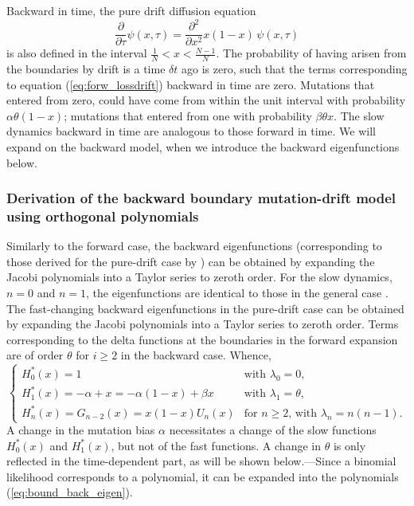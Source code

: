 \documentclass[preprint]{elsarticle}
\begin{document}
{Backward in time, the pure drift diffusion equation
\begin{equation}\label{eq:forw_drift}
  \frac{\partial}{\partial \tau} \psi(x,\tau) =\frac{\partial^2}{\partial x^2}x(1-x)\,\psi(x,\tau) 
\end{equation}
is also defined in the interval $\frac1N<x<\frac{N-1}N$. The probability of having arisen from the boundaries by drift is a time $\delta t$ ago is zero, such that the terms corresponding to equation (\ref{eq:forw_lossdrift}) backward in time are zero. Mutations that entered from zero, could have come from within the unit interval with probability $\alpha\theta(1-x)$; mutations that entered from one with probability $\beta\theta x$. The slow dynamics backward in time are analogous to those forward in time. We will expand on the backward model, when we introduce the backward eigenfunctions below.

\subsubsection{Derivation of the backward boundary mutation-drift model using orthogonal polynomials}

Similarly to the forward case, the backward eigenfunctions (corresponding to those derived for the pure-drift case by \citet{Song12}) can be obtained by expanding the Jacobi polynomials into a Taylor series to zeroth order. For the slow dynamics, $n=0$ and $n=1$, the eigenfunctions are identical to those in the general case \citep{Song12}. The fast-changing backward eigenfunctions in the pure-drift case \citep{Song12} can be obtained by expanding the Jacobi polynomials into a Taylor series to zeroth order. Terms corresponding to the delta functions at the boundaries in the forward expansion are of order $\theta$ for $i\geq 2$ in the backward case. Whence,
\begin{equation}\label{eq:bound_back_eigen}
    \begin{cases}
    H_0^{*}(x)= 1 &\text{with $\lambda_0=0$,}\\
    H_1^{*}(x)=-\alpha+x=-\alpha(1- x) +\beta x &\text{with $\lambda_1=\theta$,}\\
    H_n^{*}(x)= G_{n-2}(x)=x(1-x)U_n(x) &\text{for $n\geq2$, with $\lambda_n=n(n-1)$.}
    \end{cases}
\end{equation}
A change in the mutation bias $\alpha$ necessitates a change of the slow functions $H_0^{*}(x)$ and $H_1^{*}(x)$, but not of the fast functions. A change in $\theta$ is only reflected in the time-dependent part, as will be shown below.---Since a binomial likelihood corresponds to a polynomial, it can be expanded into the polynomials (\ref{eq:bound_back_eigen}).

}
\end{document}
